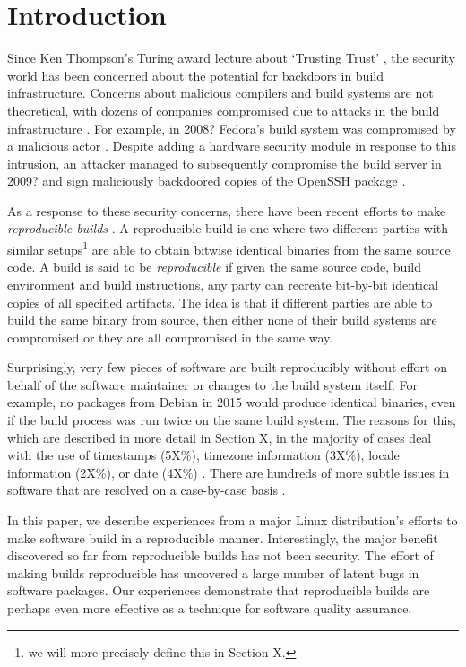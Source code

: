 \section{Introduction}
\label{SEC:introduction}

Since Ken Thompson's Turing award lecture about `Trusting Trust' 
, the security world has been concerned about the potential
for backdoors in build infrastructure.  Concerns about malicious compilers
and build systems are not
theoretical, with dozens of companies compromised due to attacks in the
build infrastructure .  For example, in 2008?
Fedora's build system was compromised by a malicious actor .
Despite adding a hardware security module in response to this intrusion, 
an attacker managed to subsequently compromise the build server in 2009? 
and sign maliciously backdoored copies of the OpenSSH package
.

As a response to these security concerns, there have been recent
efforts to make \emph{reproducible builds} .  A reproducible
build is one where two different parties with similar setups\footnote{we 
will more precisely define this in Section X.} are able 
to obtain bitwise identical binaries from the same source code.
A build is said to be \emph{reproducible} if given the same source code, build
environment and build instructions, any party can recreate bit-by-bit identical
copies of all specified artifacts.
The idea is that if different parties are able to build the same binary
from source, then either none of their build systems are compromised or
they are all compromised in the same way.

Surprisingly, very few pieces of software are built reproducibly without
effort on behalf of the software maintainer or changes to the build system
itself.  For example, no packages from Debian in 2015 would 
produce identical binaries, even if the build process was run twice on the same
build system.  The reasons for this, which are described in more detail
in Section X, in the majority of cases deal with the use
of timestamps (5X\%), timezone information (3X\%), locale information
(2X\%), or date (4X\%) .  There are hundreds of
more subtle issues in software that are resolved on a case-by-case basis
.

In this paper, we describe experiences from a major Linux distribution's
efforts to make software build in a reproducible manner.  Interestingly,
the major benefit discovered so far from reproducible builds has not been 
security.  The effort of making builds reproducible has uncovered a large
number of latent bugs in software packages.  Our experiences demonstrate
that reproducible builds are perhaps even more effective as a technique
for software quality assurance.

